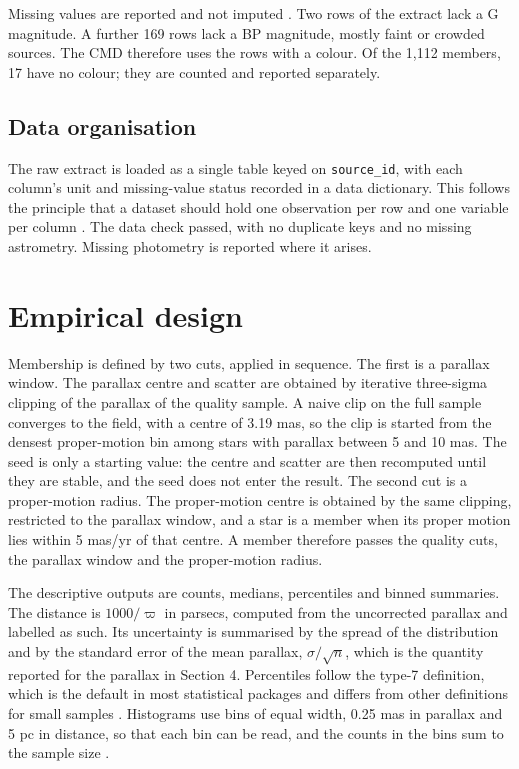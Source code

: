 \documentclass[11pt]{article}
\begin{document}
Missing values are reported and not imputed \citep{little2019statistical}. Two rows of the extract lack a G magnitude.
A further 169 rows lack a BP magnitude, mostly faint or crowded sources.
The CMD therefore uses the rows with a colour. Of the 1,112 members, 17 have no colour; they are counted and reported separately.

\subsection{Data organisation}

The raw extract is loaded as a single table keyed on \texttt{source\_id}, with each column's unit and missing-value status recorded in a data dictionary. This follows the principle that a dataset should hold one observation per row and one variable per column \citep{wickham2014tidy}. The data check passed, with no duplicate keys and no missing astrometry. Missing photometry is reported where it arises.

\section{Empirical design}

Membership is defined by two cuts, applied in sequence. The first is a parallax window. The parallax centre and scatter are obtained by iterative three-sigma clipping of the parallax of the quality sample. A naive clip on the full sample converges to the field, with a centre of 3.19 mas, so the clip is started from the densest proper-motion bin among stars with parallax between 5 and 10 mas.
The seed is only a starting value: the centre and scatter are then recomputed until they are stable, and the seed does not enter the result. The second cut is a proper-motion radius. The proper-motion centre is obtained by the same clipping, restricted to the parallax window, and a star is a member when its proper motion lies within 5 mas/yr of that centre.
A member therefore passes the quality cuts, the parallax window and the proper-motion radius.

The descriptive outputs are counts, medians, percentiles and binned summaries. The distance is $1000/\varpi$ in parsecs, computed from the uncorrected parallax and labelled as such. Its uncertainty is summarised by the spread of the distribution and by the standard error of the mean parallax, $\sigma/\sqrt{n}$, which is the quantity reported for the parallax in Section 4. Percentiles follow the type-7 definition, which is the default in most statistical packages and differs from other definitions for small samples \citep{hyndman1996sample}. Histograms use bins of equal width, 0.25 mas in parallax and 5 pc in distance, so that each bin can be read, and the counts in the bins sum to the sample size \citep{freedman1981histogram}.
\end{document}
